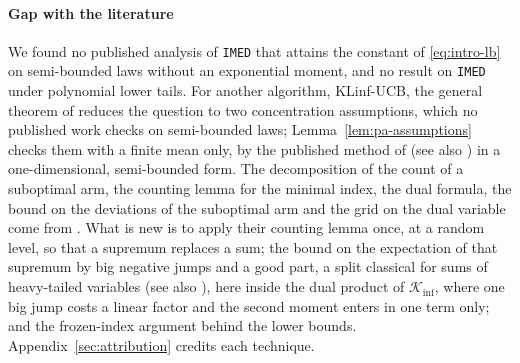 \documentclass[11pt]{article}
\begin{document}
\paragraph{Gap with the literature} We found no published analysis of \texttt{IMED} that attains the
constant of \eqref{eq:intro-lb} on semi-bounded laws without an exponential moment, and no result
on \texttt{IMED} under polynomial lower tails. For another algorithm, KLinf-UCB, the general theorem
of \citet[Theorem~3.1]{PA26} reduces the question to two concentration assumptions, which no
published work checks on semi-bounded laws; Lemma~\ref{lem:pa-assumptions} checks them with a
finite mean only, by the published method of \citet[Proposition~5]{AJK21} (see also
\citealp[Appendix~A.1]{PA26}) in a one-dimensional, semi-bounded form. The decomposition of the count of a suboptimal arm, the counting lemma for the
minimal index, the dual formula, the bound on the deviations of the suboptimal arm and the grid on
the dual variable come from \citet{HT15}. What is new is to apply their counting lemma once, at a
random level, so that a supremum replaces a sum; the bound on the expectation of that supremum by
big negative jumps and a good part, a split classical for sums of heavy-tailed variables (see also
\citealp{FN71,Nag79}), here inside the dual product of $\mathcal K_{\inf}$, where one big jump costs a
linear factor and the second moment enters in one term only; and the frozen-index argument behind
the lower bounds. Appendix~\ref{sec:attribution} credits each technique.
\end{document}
